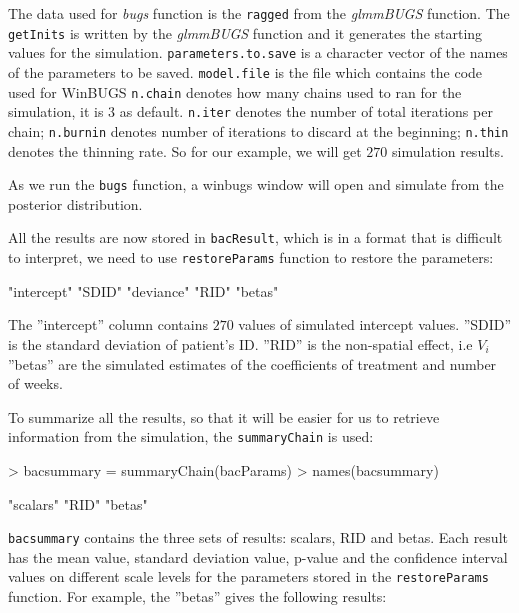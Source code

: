 \documentclass[a4paper]{report}
\begin{document}
\begin{article}
The data used for \textit{bugs} function is the \verb!ragged! from the \textit{glmmBUGS} function. 
The \verb!getInits! is written by the \textit{glmmBUGS} function and it generates the starting values for the simulation. 
\verb!parameters.to.save! is a character vector of the names of the parameters to be saved.
\verb!model.file! is the file which contains the code used for WinBUGS
\verb!n.chain! denotes how many chains used to ran for the simulation, it is $3$ as default.
\verb!n.iter! denotes the number of total iterations per chain; 
\verb!n.burnin! denotes number of iterations to discard at the beginning; 
\verb!n.thin! denotes the thinning rate. So for our example, we will get $270$ simulation results.

As we run the \verb!bugs! function, a winbugs window will open and simulate from the posterior distribution.

All the results are now stored in \verb!bacResult!, which is in a format that is difficult to interpret, we need to use  \verb!restoreParams! function to restore the parameters: 

\begin{Schunk}
\begin{Soutput}
[1] "intercept" "SDID"      "deviance"  "RID"       "betas"    
\end{Soutput}
\end{Schunk}


The ''intercept'' column contains $270$ values of simulated intercept values. 
''SDID'' is the standard deviation of patient's ID. 
''RID'' is the non-spatial effect, i.e $V_i$
''betas'' are the simulated estimates of the coefficients of treatment and number of weeks. 

To summarize all the results, so that it will be easier for us to retrieve information from the simulation, the \verb!summaryChain! is used: 

\begin{Schunk}
\begin{Sinput}
> bacsummary = summaryChain(bacParams)
> names(bacsummary)
\end{Sinput}
\begin{Soutput}
[1] "scalars" "RID"     "betas"  
\end{Soutput}
\end{Schunk}
\verb!bacsummary! contains the three sets of results: scalars, RID and betas. Each result has the mean value, standard deviation value, p-value and the confidence interval values on different scale levels for the parameters stored in the \verb!restoreParams! function. 
For example, the ''betas'' gives the following results:


\end{article}
\end{document}
